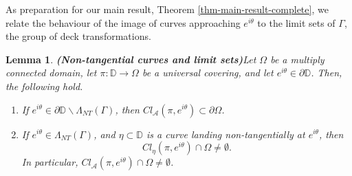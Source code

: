 \documentclass[11pt,a4paper,reqno]{amsart}
\theoremstyle{plain}
\newtheorem{lemma}[thm]{Lemma}
\theoremstyle{definition}
\theoremstyle{plain}
\def\DD{\mathbb{D}}
\def\A{\mathcal{A}}
\begin{document}
As preparation for our main result, Theorem \ref{thm-main-result-complete}, we relate the behaviour of the image of curves approaching $e^{i\theta}$ to the limit sets of $\Gamma$, the group of deck transformations.
\begin{lemma}{\bf (Non-tangential curves and limit sets)}\label{lem:non-tangential-curves}
	Let $ \Omega $ be a multiply connected domain, let $ \pi\colon \mathbb{D}\to\Omega $ be a universal covering, and let $ e^{i\theta} \in\partial\mathbb{D}$. Then, the following hold.
	\begin{enumerate}[label={\em (\alph*)}]
		\item If $e^{i\theta}\in\partial\DD\smallsetminus \Lambda_{NT}(\Gamma)$, then $Cl_{\A}(\pi, e^{i\theta}) \subset \partial\Omega$.
		\item If $e^{i\theta}\in \Lambda_{NT}(\Gamma)$, and $\eta\subset\DD$ is a curve landing non-tangentially at $e^{i\theta}$, then $$Cl_\eta(\pi, e^{i\theta})\cap\Omega \neq \emptyset.$$ In particular, $Cl_\mathcal{A}(\pi, e^{i\theta})\cap\Omega \neq \emptyset$.
	\end{enumerate}
\end{lemma}
\end{document}

